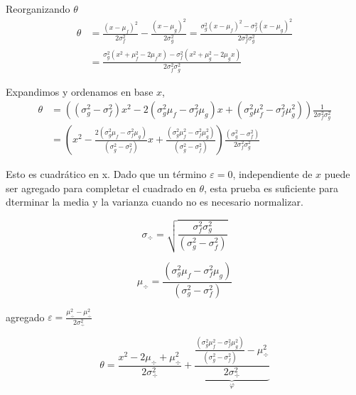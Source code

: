 \documentclass[article]{jss}
\begin{document}
\begin{appendix}
Reorganizando $\theta$
\begin{equation}
\begin{split}
 \theta & = \frac{(x-\mu_f)^2}{2\sigma_f^2} - \frac{(x-\mu_g)^2}{2\sigma_g^2} = \frac{\sigma_g^2(x-\mu_f)^2 - \sigma_f^2(x-\mu_g)^2}{2\sigma_f^2\sigma_g^2} \\[0.3cm]
 & = \frac{\sigma_g^2(x^2+\mu_f^2-2\mu_fx) - \sigma_f^2(x^2+\mu_g^2-2\mu_gx)}{2\sigma_f^2\sigma_g^2}
\end{split}
\end{equation}

Expandimos y ordenamos en base $x$,
\begin{equation}
\begin{split}
 \theta & = \left((\sigma_g^2 - \sigma_f^2)x^2 - 2(\sigma_g^2\mu_f - \sigma_f^2\mu_g)x + (\sigma_g^2\mu_f^2 - \sigma_f^2\mu_g^2 )\right) \frac{1}{2\sigma_f^2\sigma_g^2} \\[0.3cm]
 & = \left(x^2 - \frac{2(\sigma_g^2\mu_f - \sigma_f^2\mu_g)}{(\sigma_g^2 - \sigma_f^2)}x + \frac{(\sigma_g^2\mu_f^2 - \sigma_f^2\mu_g^2 )}{(\sigma_g^2 - \sigma_f^2)}\right) \frac{(\sigma_g^2 - \sigma_f^2)}{2\sigma_f^2\sigma_g^2}
\end{split}
\end{equation}

Esto es cuadr\'atico en x. Dado que un t\'ermino $\varepsilon=0$, independiente de $x$ puede ser agregado para completar el cuadrado en $\theta$, esta prueba es suficiente para dterminar la media y la varianza cuando no es necesario normalizar.

\begin{equation}
 \sigma_{\div} = \sqrt{\frac{\sigma_f^2\sigma_g^2}{(\sigma_g^2 - \sigma_f^2)}}
\end{equation}

\begin{equation}
 \mu_{\div} = \frac{(\sigma_g^2\mu_f - \sigma_f^2\mu_g)}{(\sigma_g^2 - \sigma_f^2)}
\end{equation}

agregado $\varepsilon = \frac{\mu_{\div}^2-\mu_{\div}^2}{2\sigma_{\div}^2}$

\begin{equation}
\theta = \frac{x^2 - 2\mu_{\div} + \mu_{\div}^2 }{2\sigma_{\div}^2} + \underbrace{ \frac{ \frac{(\sigma_g^2\mu_f^2 - \sigma_f^2\mu_g^2)}{(\sigma_g^2 - \sigma_f^2)} - \mu_{\div}^2 }{2\sigma_{\div}^2} }_{\varphi}
\end{equation}


\end{appendix}
\end{document}
